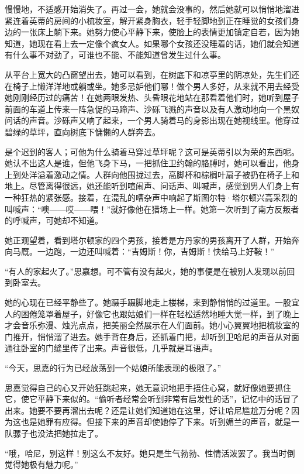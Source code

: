 \par 慢慢地，不适感开始消失了。再过一会，她就会没事的，然后她就可以悄悄地溜进紧连着英蒂的房间的小梳妆室，解开紧身胸衣，轻手轻脚地到正在睡觉的女孩们身边的一张床上躺下来。她努力使心平静下来，使脸上的表情更加镇定自若，因为她知道，她现在看上去一定像个疯女人。如果哪个女孩还没睡着的话，她们就会知道有什么事不对劲了，可谁也不能、不能知道曾发生过什么事。
\par 从平台上宽大的凸窗望出去，她可以看到，在树底下和凉亭里的阴凉处，先生们还在椅子上懒洋洋地或躺或坐。她多忌妒他们哪！做个男人多好，从来就不用去经受她刚刚经历过的痛苦！在她两眼发热、头昏眼花地站在那看着他们时，她听到屋子前面的车道上传来一阵急促的马蹄声、沙砾飞溅的声音以及有人激动地向一个黑奴问话的声音。沙砾声又响了起来，一个男人骑着马的身影出现在她视线里。他穿过碧绿的草坪，直向树底下慵懒的人群奔去。
\par 是个迟到的客人；可他为什么骑着马穿过草坪呢？这可是英蒂引以为荣的东西呢。她认不出这人是谁，但他飞身下马，一把抓住卫约翰的胳膊时，她可以看出，他身上到处洋溢着激动之情。人群向他围拢过去，高脚杯和棕榈叶扇子被扔在椅子上和地上。尽管离得很远，她还能听到喧闹声、问话声、叫喊声，感觉到男人们身上有一种狂热的紧张感。接着，在混乱的嘈杂声中响起了斯图尔特·塔尔顿兴高采烈的叫喊声：“噢——哎——喂！”就好像他在猎场上一样。她第一次听到了南方反叛者的呼喊声，可她却不知道。
\par 她正观望着，看到塔尔顿家的四个男孩，接着是方丹家的男孩离开了人群，开始奔向马厩。一边跑，一边还叫喊着：“吉姆斯！你，吉姆斯！快给马上好鞍！”
\par “有人的家起火了。”思嘉想。可不管有没有起火，她的事便是在被别人发现以前回到卧室去。
\par 她的心现在已经平静些了。她蹑手蹑脚地走上楼梯，来到静悄悄的过道里。一股宜人的困倦笼罩着屋子，好像它也跟姑娘们一样在轻松适然地睡大觉一样，到了晚上才会音乐弥漫、烛光点点，把美丽全然展示在人们面前。她小心翼翼地把梳妆室的门推开，悄悄溜了进去。她手背在身后，还抓着门把，却听到卫哈尼的声音从对面通往卧室的门缝里传了出来。声音很低，几乎就是耳语声。
\par “今天，思嘉的行为已经放荡到一个姑娘所能表现的极限了。”
\par 思嘉觉得自己的心又开始狂跳起来，她无意识地把手捂住心窝，就好像她要抓住它，使它平静下来似的。“偷听者经常会听到非常有启发性的话”，记忆中的话冒了出来。她要不要再溜出去呢？还是让她们知道她在这里，好让哈尼尴尬万分呢？因为这也是她罪有应得。但接下来的声音却使她停了下来。听到媚兰的声音，就是一队骡子也没法把她拉走了。
\par “哦，哈尼，别这样！别这么不友好。她只是生气勃勃、性情活泼罢了。我当时倒觉得她极有魅力呢。”
